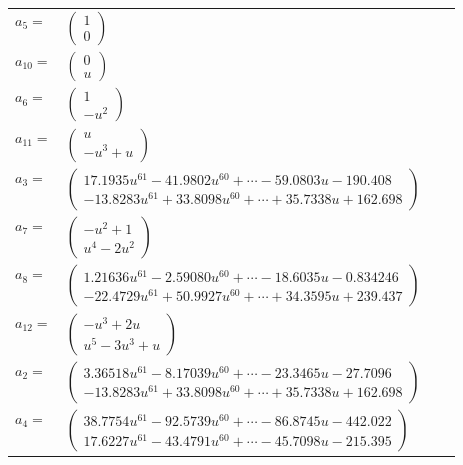 \documentclass[1p]{elsarticle_modified}
\theoremstyle{definition}
\begin{document}
\begin{tabular}{m{7pt} m{180pt} m{7pt} m{180pt} }
\flushright $a_{5}=$&$\begin{pmatrix}1\\0\end{pmatrix}$ \\
\flushright $a_{10}=$&$\begin{pmatrix}0\\u\end{pmatrix}$ \\
\flushright $a_{6}=$&$\begin{pmatrix}1\\- u^2\end{pmatrix}$ \\
\flushright $a_{11}=$&$\begin{pmatrix}u\\- u^3+u\end{pmatrix}$ \\
\flushright $a_{3}=$&$\begin{pmatrix}17.1935 u^{61}-41.9802 u^{60}+\cdots-59.0803 u-190.408\\-13.8283 u^{61}+33.8098 u^{60}+\cdots+35.7338 u+162.698\end{pmatrix}$ \\
\flushright $a_{7}=$&$\begin{pmatrix}- u^2+1\\u^4-2 u^2\end{pmatrix}$ \\
\flushright $a_{8}=$&$\begin{pmatrix}1.21636 u^{61}-2.59080 u^{60}+\cdots-18.6035 u-0.834246\\-22.4729 u^{61}+50.9927 u^{60}+\cdots+34.3595 u+239.437\end{pmatrix}$ \\
\flushright $a_{12}=$&$\begin{pmatrix}- u^3+2 u\\u^5-3 u^3+u\end{pmatrix}$ \\
\flushright $a_{2}=$&$\begin{pmatrix}3.36518 u^{61}-8.17039 u^{60}+\cdots-23.3465 u-27.7096\\-13.8283 u^{61}+33.8098 u^{60}+\cdots+35.7338 u+162.698\end{pmatrix}$ \\
\flushright $a_{4}=$&$\begin{pmatrix}38.7754 u^{61}-92.5739 u^{60}+\cdots-86.8745 u-442.022\\17.6227 u^{61}-43.4791 u^{60}+\cdots-45.7098 u-215.395\end{pmatrix}$ \\

\end{tabular}
\end{document}

